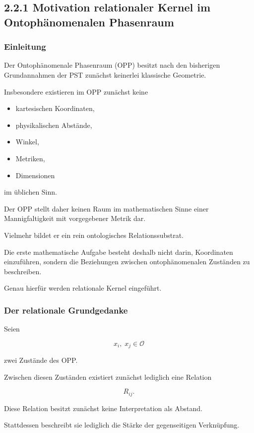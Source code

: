 \subsection{2.2.1 Motivation relationaler Kernel im Ontophänomenalen Phasenraum}

\subsubsection{Einleitung}

Der Ontophänomenale Phasenraum (OPP) besitzt nach den bisherigen
Grundannahmen der PST zunächst keinerlei klassische Geometrie.

Insbesondere existieren im OPP zunächst keine

\begin{itemize}
\item kartesischen Koordinaten,
\item physikalischen Abstände,
\item Winkel,
\item Metriken,
\item Dimensionen
\end{itemize}

im üblichen Sinn.

Der OPP stellt daher keinen Raum im mathematischen Sinne einer
Mannigfaltigkeit mit vorgegebener Metrik dar.

Vielmehr bildet er ein rein ontologisches Relationssubstrat.

Die erste mathematische Aufgabe besteht deshalb nicht darin,
Koordinaten einzuführen, sondern die Beziehungen zwischen
ontophänomenalen Zuständen zu beschreiben.

Genau hierfür werden relationale Kernel eingeführt.

\bigskip

\subsubsection{Der relationale Grundgedanke}

Seien

\[
x_i,\;x_j \in \mathcal{O}
\]

zwei Zustände des OPP.

Zwischen diesen Zuständen existiert zunächst lediglich eine
Relation

\[
R_{ij}.
\]

Diese Relation besitzt zunächst keine Interpretation als Abstand.

Stattdessen beschreibt sie lediglich die Stärke der gegenseitigen
Verknüpfung.

